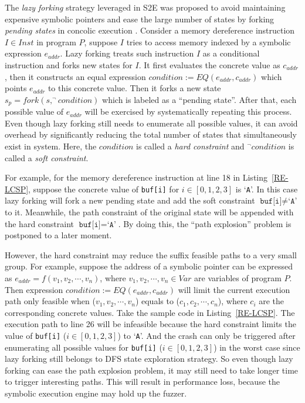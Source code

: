The \textit{lazy forking} strategy leveraged in S2E was proposed to avoid 
maintaining expensive symbolic pointers and ease the large number 
of states by forking \textit{pending states} in concolic 
execution \cite{chipounov2011s2e}. 
Consider a memory dereference instruction $I\in Inst$ in program $P$, 
suppose $I$ tries to access memory indexed by a symbolic expression 
$e_{addr}$.
Lazy forking treats such instruction $I$ as a conditional instruction 
and forks new states for $I$. It first evaluates the concrete value 
as $c_{addr}$, then it constructs an equal
expression $condition:= EQ(e_{addr}, c_{addr})$ 
which points $e_{addr}$ to this concrete value. Then it forks a 
new state $s_p=fork(s, ^\neg condition)$ which is labeled as a 
``pending state''. After that, each possible value of $e_{addr}$ 
will be exercised by systematically repeating this process. Even 
though lazy forking still needs to enumerate all possible values, 
it can avoid overhead by significantly reducing the total number 
of states that simultaneously exist in system. Here, 
the $condition$ is called a \textit{hard constraint} and 
$^\neg condition$ is called a \textit{soft constraint}.

For example, for the memory dereference instruction at line 18 
in Listing~\ref{RE-LCSP}, suppose the concrete value of 
\texttt{buf[i]} for $i\in[0,1,2,3]$ is `\texttt{A}'. 
In this case lazy forking will fork a new pending state and 
add the soft constraint $\texttt{buf[i]}\neq\texttt{`A'}$ to 
it. Meanwhile, the path constraint of the original state will 
be appended with the hard constraint $\texttt{buf[i]}=\texttt{`A'}$.
By doing this, the ``path explosion'' problem is postponed to a later moment.

However, the hard constraint may reduce the suffix feasible paths 
to a very small group. For example, suppose the address of a symbolic 
pointer can be expressed as $e_{addr}=f(v_1, v_2,\cdots, v_n)$, 
where $v_1, v_2,\cdots, v_n\in Var$ are variables of program $P$. 
Then expression $condition:= EQ(e_{addr}, c_{addr})$ will limit 
the current execution path only feasible when ($v_1, v_2,\cdots, v_n$) 
equals to ($c_1, c_2,\cdots, c_n$), where $c_i$ are the 
corresponding concrete values. 
Take the sample code in Listing~\ref{RE-LCSP}. The execution path 
to line 26 will be infeasible because the hard constraint limits 
the value of \texttt{buf[i]} ($i\in[0,1,2,3]$) to `\texttt{A}'. 
And the crash can only be triggered after enumerating all possible 
values for \texttt{buf[i]} ($i\in[0,1,2,3]$) in the worst case since
lazy forking still belongs to DFS state exploration strategy.
So even though lazy forking can ease the path explosion problem, 
it may still need to take longer time to trigger interesting paths. 
This will result in performance loss, because the symbolic 
execution engine may hold up the fuzzer. 

